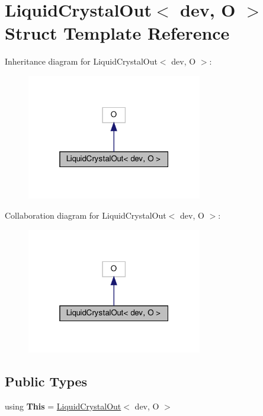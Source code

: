 \hypertarget{structLiquidCrystalOut}{}\section{Liquid\+Crystal\+Out$<$ dev, O $>$ Struct Template Reference}
\label{structLiquidCrystalOut}


Inheritance diagram for Liquid\+Crystal\+Out$<$ dev, O $>$\+:\nopagebreak
\begin{figure}[H]
\begin{center}
\leavevmode
\includegraphics[width=217pt]{structLiquidCrystalOut__inherit__graph}
\end{center}
\end{figure}


Collaboration diagram for Liquid\+Crystal\+Out$<$ dev, O $>$\+:\nopagebreak
\begin{figure}[H]
\begin{center}
\leavevmode
\includegraphics[width=217pt]{structLiquidCrystalOut__coll__graph}
\end{center}
\end{figure}
\subsection*{Public Types}
\begin{DoxyCompactItemize}
\item 
\mbox{\label{structLiquidCrystalOut_a26c8d15af8dc0aec9411945fe3725a3d}} 
using {\bfseries This} = \hyperlink{structLiquidCrystalOut}{Liquid\+Crystal\+Out}$<$ dev, O $>$
\end{DoxyCompactItemize}
